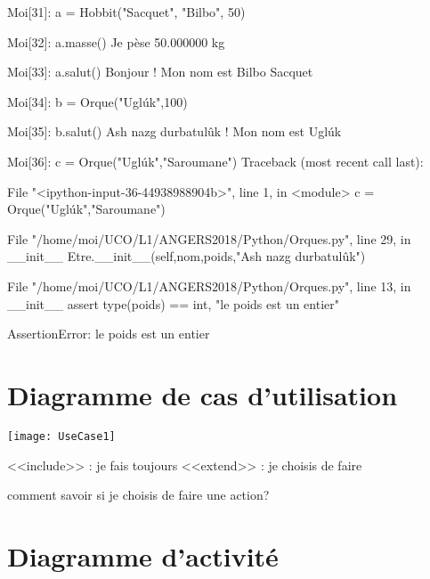 \documentclass[french]{beamer}
\begin{document}
  \begin{frame}[fragile]
    \begin{pythoncode}
Moi[31]: a = Hobbit("Sacquet", "Bilbo", 50)

Moi[32]: a.masse()
Je pèse 50.000000 kg

Moi[33]: a.salut()
Bonjour ! Mon nom est Bilbo Sacquet

Moi[34]: b = Orque("Uglúk",100)

Moi[35]: b.salut()
Ash nazg durbatulûk ! Mon nom est Uglúk

Moi[36]: c = Orque("Uglúk","Saroumane")
Traceback (most recent call last):

  File "<ipython-input-36-44938988904b>", line 1, in <module>
    c = Orque("Uglúk","Saroumane")

  File "/home/moi/UCO/L1/ANGERS2018/Python/Orques.py", line 29, in __init__
    Etre.__init__(self,nom,poids,"Ash nazg durbatulûk")

  File "/home/moi/UCO/L1/ANGERS2018/Python/Orques.py", line 13, in __init__
    assert type(poids) == int, "le poids est un entier"

AssertionError: le poids est un entier
\end{pythoncode}


  \end{frame}



  \section{Diagramme de cas d'utilisation}


  \begin{frame}
    
\begin{center}
  \texttt{[image: UseCase1]}
\end{center}

\pause

<<include>> : je fais toujours 
\pause
<<extend>> : je choisis de faire

\pause comment savoir si je choisis de faire une action?

\end{frame}



\section{Diagramme d'activité}
\end{document}
